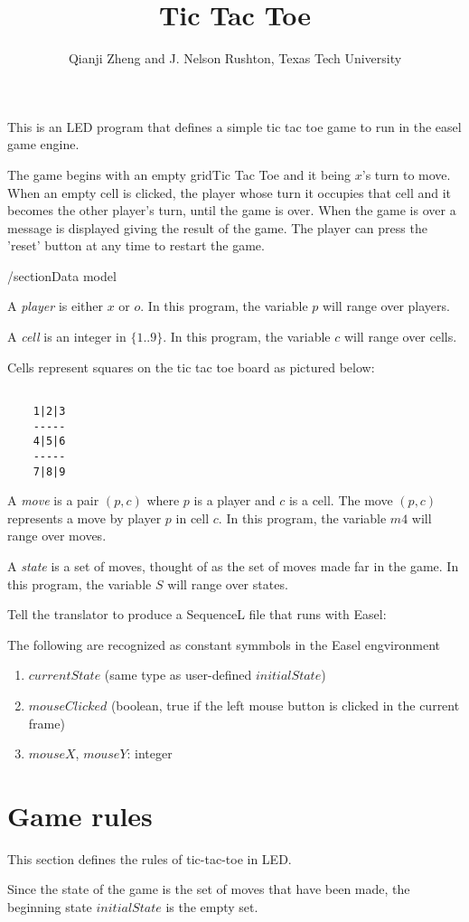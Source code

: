 \documentclass{led_doc}
\begin{document}
\begin{ledCmnt}
\title{Tic Tac Toe}
\date{}
\author{Qianji Zheng and J. Nelson Rushton, Texas Tech University}
\maketitle

This is an LED program that defines a simple tic tac toe game to run in the easel game engine.

The game begins with an empty gridTic Tac Toe
 and it being $x$'s turn to move. When an empty cell is clicked,
the player whose turn it occupies that cell and it becomes the other player's turn, until the
game is over. When the game is over a message is displayed giving the result of the  game.
The player can press the 'reset' button at any time to restart the game.

/section{Data model}


A {\em player} is either $x$ or $o$. In this program, the variable $p$ will range over players.

A {\em cell} is an integer in $\{1..9\}$. In this program, the variable $c$ will range over cells.

Cells represent squares on the tic tac toe board as pictured below:

\begin{verbatim}

    1|2|3
    -----
    4|5|6
    -----
    7|8|9

\end{verbatim}

A {\em move} is a pair $(p,c)$ where $p$ is a player and $c$ is a cell.
The move $(p,c)$ represents a move by player $p$ in cell $c$. In this program,
the variable $m4$ will range over moves.

A {\em state} is a set of moves, thought of as the set of moves made far in the
game. In this program, the variable $S$ will range over states.

Tell the translator to produce a SequenceL file that runs with Easel:
\end{ledCmnt}

\begin{ledCmnt}
The following are recognized as constant symmbols in the Easel engvironment
\begin{enumerate}
\item $currentState$ (same type as user-defined $initialState$)
\item $mouseClicked$ (boolean, true if the left mouse button is clicked in the current frame)
\item $mouseX$, $mouseY$: integer
\end{enumerate}

\section{Game rules}


This section defines the rules of tic-tac-toe in LED.

Since the state of the game is the set of moves that have been made,
the beginning state $initialState$ is the empty set.
\end{ledCmnt}
\end{document}
